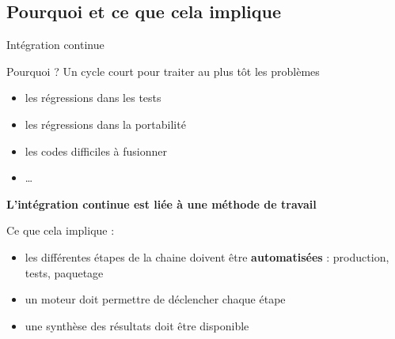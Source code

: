 \documentclass[9pt]{beamer}
\begin{document}
\subsection{Pourquoi et ce que cela implique}
\begin{frame}{Intégration continue}

  \begin{block}{Pourquoi ?}
    Un cycle court pour traiter au plus tôt les problèmes
    \begin{itemize}
    \item les régressions dans les tests
    \item les régressions dans la portabilité
    \item les codes difficiles à fusionner 
    \item \dots
  \end{itemize}
  
  \textbf{L'intégration continue est liée à une méthode de travail}
  
\end{block}

\begin{block}{Ce que cela implique :}
\begin{itemize}
\item les différentes étapes de la chaine doivent être \textbf{automatisées} : production, tests, paquetage
\item un moteur doit permettre de déclencher chaque étape
\item une synthèse des résultats doit être disponible
\end{itemize}
\end{block}
\end{frame}
\end{document}
